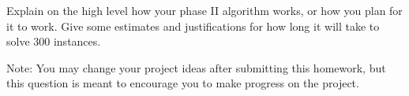 \documentclass{article}\usepackage[utf8]{inputenc}\usepackage[margin=0.4cm,top=0.4cm,bottom=0.4cm]{geometry}\usepackage[usenames,dvipsnames,svgnames,table]{xcolor}
\begin{document}
\vspace{4pt}\noindent Explain on the high level how your phase II algorithm works, or how you plan for it to work. Give some estimates and justifications for how long it will take to solve 300 instances.

\vspace{4pt}\noindent Note: You may change your project ideas after submitting this homework, but this question is meant to encourage you to make progress on the project.
\BeginSolution %
\EndSolution
\clearpage
\end{document}

